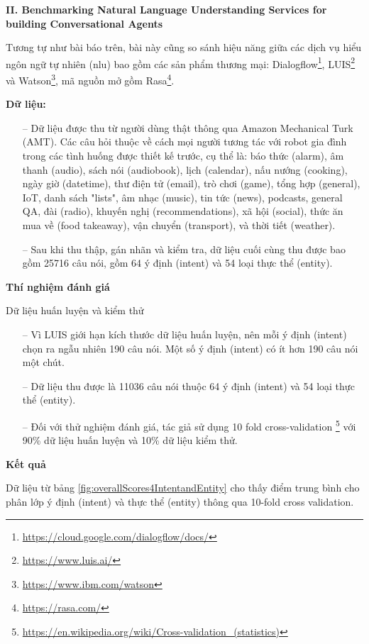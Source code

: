 \textbf{II. Benchmarking Natural Language Understanding Services for building Conversational Agents}

Tương tự như bài báo trên, bài này cũng so sánh hiệu năng giữa các dịch vụ hiểu ngôn ngữ tự nhiên (\ac{nlu}) bao gồm các sản phẩm thương mại: Dialogflow\footnote{\url{https://cloud.google.com/dialogflow/docs/}}, LUIS\footnote{\url{https://www.luis.ai/}} và Watson\footnote{\url{https://www.ibm.com/watson}}, mã nguồn mở gồm Rasa\footnote{\url{https://rasa.com/}}.


\textbf{Dữ liệu: }

\begin{itemize}
    \item[--] Dữ liệu được thu từ người dùng thật thông qua Amazon Mechanical Turk (AMT). Các câu hỏi thuộc về cách mọi người tương tác với robot gia đình trong các tình huống được thiết kế trước, cụ thể là: báo thức (alarm), âm thanh (audio), sách nói (audiobook), lịch (calendar), nấu nướng (cooking), ngày giờ (datetime), thư điện tử (email), trò chơi (game), tổng hợp (general), IoT, danh sách "lists", âm nhạc (music), tin tức (news), podcasts, general QA, đài (radio), khuyến nghị (recommendations), xã hội (social), thức ăn mua về (food takeaway), vận chuyển (transport), và thời tiết (weather).
    \item[--] Sau khi thu thập, gán nhãn và kiểm tra, dữ liệu cuối cùng thu được bao gồm 25716 câu nói, gồm 64 ý định (intent) và 54 loại thực thể (entity).
\end{itemize}

\textbf{Thí nghiệm đánh giá}

Dữ liệu huấn luyện và kiểm thử
\begin{itemize}
    \item[--] Vì LUIS giới hạn kích thước dữ liệu huấn luyện, nên mỗi ý định (intent) chọn ra ngẫu nhiên 190 câu nói. Một số ý định (intent) có ít hơn 190 câu nói một chút.
    \item[--] Dữ liệu thu được là 11036 câu nói thuộc 64 ý định (intent) và 54 loại thực thể (entity).
    \item[--] Đối với thử nghiệm đánh giá, tác giả sử dụng 10 fold cross-validation \footnote{\url{https://en.wikipedia.org/wiki/Cross-validation_(statistics)}} với 90\% dữ liệu huấn luyện và 10\% dữ liệu kiểm thử.
\end{itemize}

\textbf{Kết quả}

Dữ liệu từ bảng \ref{fig:overallScores4IntentandEntity} cho thấy điểm trung bình cho phân lớp ý định (intent) và thực thể (entity) thông qua 10-fold cross validation.

